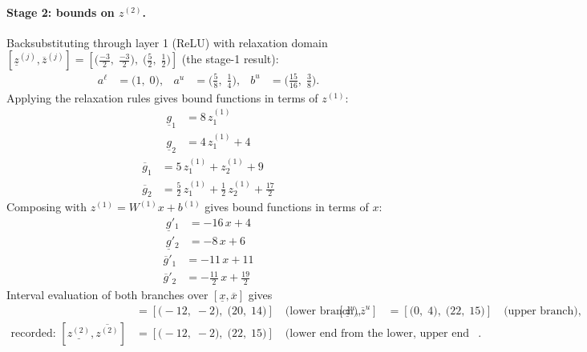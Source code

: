 \documentclass[11pt]{article}
\begin{document}
\paragraph{Stage 2: bounds on $z^{(2)}$.}
Backsubstituting through layer 1 (ReLU) with relaxation domain $[\underline{z}^{(j)}, \overline{z}^{(j)}] = [\bigl(\frac{-3}{2},\; \frac{-3}{2}\bigr),\; \bigl(\frac{5}{2},\; \frac{1}{2}\bigr)]$ (the stage-1 result):
\begin{align*}
a^{\ell} &= \bigl(1,\; 0\bigr), & a^{u} &= \bigl(\frac{5}{8},\; \frac{1}{4}\bigr), & b^{u} &= \bigl(\frac{15}{16},\; \frac{3}{8}\bigr).
\end{align*}
Applying the relaxation rules gives bound functions in terms of $z^{(1)}$:
\begin{align*}
\underline{g}_{1} &= 8\,z^{(1)}_{1} \\
\underline{g}_{2} &= 4\,z^{(1)}_{1} + 4
\end{align*}
\begin{align*}
\overline{g}_{1} &= 5\,z^{(1)}_{1} + z^{(1)}_{2} + 9 \\
\overline{g}_{2} &= \frac{5}{2}\,z^{(1)}_{1} + \frac{1}{2}\,z^{(1)}_{2} + \frac{17}{2}
\end{align*}
Composing with $z^{(1)} = W^{(1)} x + b^{(1)}$ gives bound functions in terms of $x$:
\begin{align*}
\underline{g}'_{1} &= -16\,x + 4 \\
\underline{g}'_{2} &= -8\,x + 6
\end{align*}
\begin{align*}
\overline{g}'_{1} &= -11\,x + 11 \\
\overline{g}'_{2} &= -\frac{11}{2}\,x + \frac{19}{2}
\end{align*}
Interval evaluation of both branches over $[\underline{x}, \overline{x}]$ gives
\begin{align*}
[\underline{z}^{\ell}, \overline{z}^{\ell}] &= [\bigl(-12,\; -2\bigr),\; \bigl(20,\; 14\bigr)] \quad\text{(lower branch)}, & [\underline{z}^{u}, \overline{z}^{u}] &= [\bigl(0,\; 4\bigr),\; \bigl(22,\; 15\bigr)] \quad\text{(upper branch)}, \\
\text{recorded: } [\underline{z^{(2)}}, \overline{z^{(2)}}] &= [\bigl(-12,\; -2\bigr),\; \bigl(22,\; 15\bigr)] \quad\text{(lower end from the lower, upper end from the upper branch)}.
\end{align*}
\end{document}
